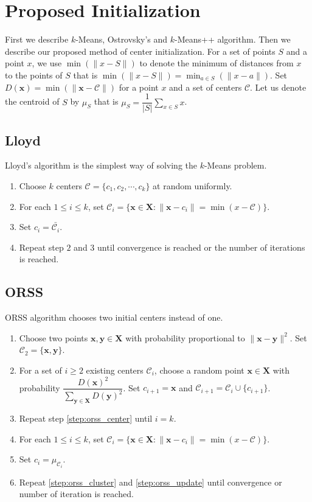\documentclass[twoside, 11pt]{article}
\newcommand{\x}{\mathbf{x}}
\newcommand{\X}{\mathbf{X}}
\newcommand{\y}{\mathbf{y}}
\newcommand{\C}{\mathcal{C}}
\begin{document}
	\section{Proposed Initialization}
	First we describe $k$-Means, Ostrovsky's and $k$-Means++ algorithm. Then we describe our proposed method of center initialization. For a set of points $S$ and a point $x$, we use $\min(\|x-S\|)$ to denote the minimum of distances from $x$ to the points of $S$ that is $\min(\| x-S\|)=\min_{a\in S}(\| x-a\|)$. Set $D(\x)=\min(\|\x-\C\|)$ for a point $x$ and a set of centers $\C$. Let us denote the centroid of $S$ by $\mu_S$ that is $\mu_S=\dfrac{1}{|S|}\sum_{x\in S}x$.
	\subsection{Lloyd}
	Lloyd's algorithm is the simplest way of solving the $k$-Means problem.
		\begin{enumerate}[i]
			\item Choose $k$ centers $\C=\{c_1,c_2,\cdots,c_k\}$ at random uniformly.
			\item For each $1\leq i\leq k$, set $\C_i=\{\x\in\X:\|\x-c_i\|=\min(x-\C)\}$.
			\item Set $c_i=\bar{\C_i}$.
			\item Repeat step $2$ and $3$ until convergence is reached or the number of iterations is reached.
		\end{enumerate}
	\subsection{ORSS}
	ORSS algorithm \citep{ostrovsky} chooses two initial centers instead of one.
		\begin{enumerate}[i]
			\item Choose two points $\x,\y\in\X$ with probability proportional to $\|\x-\y\|^2$. Set $\C_2=\{\x,\y\}$.
			\item For a set of $i\geq2$ existing centers $\C_i$, choose a random point $\x\in\X$ with probability $\dfrac{D(\x)^2}{\sum_{\y\in\X}D(\y)^2}$. Set $c_{i+1}=\x$ and $\C_{i+1}=\C_i\cup\{c_{i+1}\}$.\label{step:orss_center}
			\item Repeat step \eqref{step:orss_center} until $i=k$.
			\item For each $1\leq i\leq k$, set $\C_i=\{\x\in\X:\|\x-c_i\|=\min(x-\C)\}$.\label{step:orss_cluster}
			\item Set $c_i=\mu_{\C_i}$.\label{step:orss_update}
			\item Repeat \eqref{step:orss_cluster} and \eqref{step:orss_update} until convergence or number of iteration is reached.
		\end{enumerate}
\end{document}
